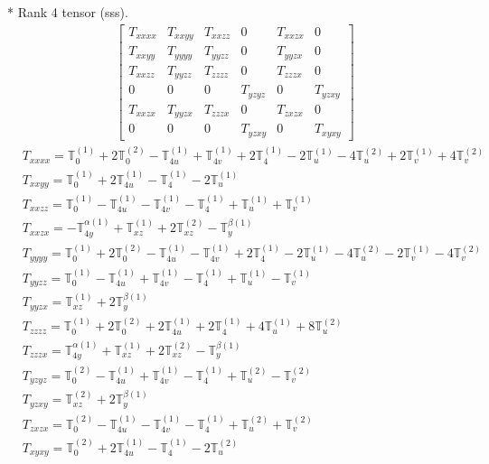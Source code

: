 \documentclass[fleqn,8pt,landscape]{jsarticle}
\begin{document}
* Rank 4 tensor (sss).
\begin{align*}
\begin{bmatrix} T_{xxxx} & T_{xxyy} & T_{xxzz} & 0 & T_{xxzx} & 0 \\ T_{xxyy} & T_{yyyy} & T_{yyzz} & 0 & T_{yyzx} & 0 \\ T_{xxzz} & T_{yyzz} & T_{zzzz} & 0 & T_{zzzx} & 0 \\ 0 & 0 & 0 & T_{yzyz} & 0 & T_{yzxy} \\ T_{xxzx} & T_{yyzx} & T_{zzzx} & 0 & T_{zxzx} & 0 \\ 0 & 0 & 0 & T_{yzxy} & 0 & T_{xyxy} \end{bmatrix}
\end{align*}
\begin{align*}
& T_{xxxx} = \mathbb{T}_{0}^{(1)} + 2 \mathbb{T}_{0}^{(2)} - \mathbb{T}_{4u}^{(1)} + \mathbb{T}_{4v}^{(1)} + 2 \mathbb{T}_{4}^{(1)} - 2 \mathbb{T}_{u}^{(1)} - 4 \mathbb{T}_{u}^{(2)} + 2 \mathbb{T}_{v}^{(1)} + 4 \mathbb{T}_{v}^{(2)} \\
& T_{xxyy} = \mathbb{T}_{0}^{(1)} + 2 \mathbb{T}_{4u}^{(1)} - \mathbb{T}_{4}^{(1)} - 2 \mathbb{T}_{u}^{(1)} \\
& T_{xxzz} = \mathbb{T}_{0}^{(1)} - \mathbb{T}_{4u}^{(1)} - \mathbb{T}_{4v}^{(1)} - \mathbb{T}_{4}^{(1)} + \mathbb{T}_{u}^{(1)} + \mathbb{T}_{v}^{(1)} \\
& T_{xxzx} = - \mathbb{T}_{4y}^{\alpha(1)} + \mathbb{T}_{xz}^{(1)} + 2 \mathbb{T}_{xz}^{(2)} - \mathbb{T}_{y}^{\beta(1)} \\
& T_{yyyy} = \mathbb{T}_{0}^{(1)} + 2 \mathbb{T}_{0}^{(2)} - \mathbb{T}_{4u}^{(1)} - \mathbb{T}_{4v}^{(1)} + 2 \mathbb{T}_{4}^{(1)} - 2 \mathbb{T}_{u}^{(1)} - 4 \mathbb{T}_{u}^{(2)} - 2 \mathbb{T}_{v}^{(1)} - 4 \mathbb{T}_{v}^{(2)} \\
& T_{yyzz} = \mathbb{T}_{0}^{(1)} - \mathbb{T}_{4u}^{(1)} + \mathbb{T}_{4v}^{(1)} - \mathbb{T}_{4}^{(1)} + \mathbb{T}_{u}^{(1)} - \mathbb{T}_{v}^{(1)} \\
& T_{yyzx} = \mathbb{T}_{xz}^{(1)} + 2 \mathbb{T}_{y}^{\beta(1)} \\
& T_{zzzz} = \mathbb{T}_{0}^{(1)} + 2 \mathbb{T}_{0}^{(2)} + 2 \mathbb{T}_{4u}^{(1)} + 2 \mathbb{T}_{4}^{(1)} + 4 \mathbb{T}_{u}^{(1)} + 8 \mathbb{T}_{u}^{(2)} \\
& T_{zzzx} = \mathbb{T}_{4y}^{\alpha(1)} + \mathbb{T}_{xz}^{(1)} + 2 \mathbb{T}_{xz}^{(2)} - \mathbb{T}_{y}^{\beta(1)} \\
& T_{yzyz} = \mathbb{T}_{0}^{(2)} - \mathbb{T}_{4u}^{(1)} + \mathbb{T}_{4v}^{(1)} - \mathbb{T}_{4}^{(1)} + \mathbb{T}_{u}^{(2)} - \mathbb{T}_{v}^{(2)} \\
& T_{yzxy} = \mathbb{T}_{xz}^{(2)} + 2 \mathbb{T}_{y}^{\beta(1)} \\
& T_{zxzx} = \mathbb{T}_{0}^{(2)} - \mathbb{T}_{4u}^{(1)} - \mathbb{T}_{4v}^{(1)} - \mathbb{T}_{4}^{(1)} + \mathbb{T}_{u}^{(2)} + \mathbb{T}_{v}^{(2)} \\
& T_{xyxy} = \mathbb{T}_{0}^{(2)} + 2 \mathbb{T}_{4u}^{(1)} - \mathbb{T}_{4}^{(1)} - 2 \mathbb{T}_{u}^{(2)}
\end{align*}
\end{document}
